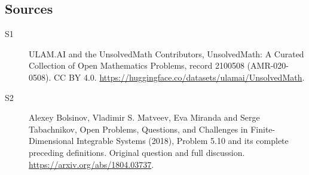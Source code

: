 \documentclass[11pt]{article}
\begin{document}
\subsection{Sources}
\begin{description}
\item[\hypertarget{source:2100508:1}{S1}] ULAM.AI and the UnsolvedMath Contributors, UnsolvedMath: A Curated Collection of Open Mathematics Problems, record 2100508 (AMR-020-0508). CC BY 4.0. \url{https://huggingface.co/datasets/ulamai/UnsolvedMath}.
\item[\hypertarget{source:2100508:2}{S2}] Alexey Bolsinov, Vladimir S. Matveev, Eva Miranda and Serge Tabachnikov, Open Problems, Questions, and Challenges in Finite-Dimensional Integrable Systems (2018), Problem 5.10 and its complete preceding definitions. Original question and full discussion. \url{https://arxiv.org/abs/1804.03737}.

\end{description}
\label{end:2100508}
\end{document}
